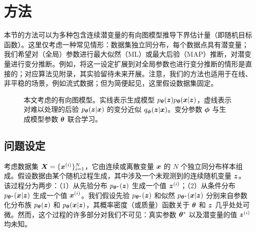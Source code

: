 \section{方法}
\label{sec:method}

本节的方法可以为多种包含连续潜变量的有向图模型推导下界估计量（即随机目标函数）。这里仅考虑一种常见情形：数据集独立同分布，每个数据点具有潜变量；我们希望对（全局）参数进行最大似然（ML）或最大后验（MAP）推断，对潜变量进行变分推断。例如，将这一设定扩展到对全局参数也进行变分推断的情形是直接的；对应算法见附录，其实验留待未来开展。注意，我们的方法也适用于在线、非平稳的场景，例如流式数据；但为简便起见，这里假设数据集固定。

\begin{figure}[t]
\begin{center}
\end{center}
\caption{
本文考虑的有向图模型。实线表示生成模型 $p_{\bm{\theta}}(\bm{z})p_{\bm{\theta}}(\bm{x}|\bm{z})$，虚线表示对难以处理的后验 $p_{\bm{\theta}}(\bm{z}|\bm{x})$ 的变分近似 $q_{\bm{\phi}}(\bm{z}|\bm{x})$。变分参数 $\bm{\phi}$ 与生成模型参数 $\bm{\theta}$ 联合学习。
}\label{fig:model}
\end{figure}

\subsection{问题设定}
\label{sec:problem}

考虑数据集 $\bm{X} = \{\bm{x}^{(i)}\}_{i=1}^N$，它由连续或离散变量 $\bm{x}$ 的 $N$ 个独立同分布样本组成。假设数据由某个随机过程生成，其中涉及一个未观测到的连续随机变量 $\bm{z}$。该过程分为两步：（1）从先验分布 $p_{\bm{\theta}^*}(\bm{z})$ 生成一个值 $\bm{z}^{(i)}$；（2）从条件分布 $p_{\bm{\theta}^*}(\bm{x}|\bm{z})$ 生成一个值 $\bm{x}^{(i)}$。我们假设先验 $p_{\bm{\theta}^*}(\bm{z})$ 和似然 $p_{\bm{\theta}^*}(\bm{x}|\bm{z})$ 分别来自参数化分布族 $p_{\bm{\theta}}(\bm{z})$ 和 $p_{\bm{\theta}}(\bm{x}|\bm{z})$，其概率密度（或质量）函数关于 $\bm{\theta}$ 和 $\bm{z}$ 几乎处处可微。然而，这个过程的许多部分对我们不可见：真实参数 $\bm{\theta}^*$ 以及潜变量的值 $\bm{z}^{(i)}$ 均未知。

